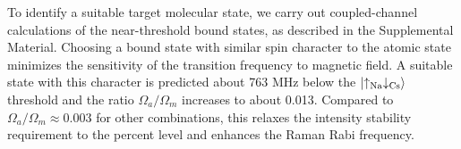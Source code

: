 \documentclass[aps,prl,twocolumn,10pt,superscriptaddress]{revtex4-1}
\newcommand{\Na}{\mathrm{Na}}
\newcommand{\Cs}{\mathrm{Cs}}
\begin{document}
To identify a suitable target molecular state, we carry out coupled-channel calculations of the near-threshold bound states, as described in the Supplemental Material.
Choosing a bound state with similar spin character to the atomic state  minimizes the sensitivity of the transition frequency to magnetic field.
A suitable state with this character is predicted about 763 MHz below the $\ket{\uparrow_{\Na} \downarrow_{\Cs}}$ threshold and the ratio $\Omega_a/\Omega_m$ increases to about 0.013.
Compared to $\Omega_a/\Omega_m \approx 0.003$
for other combinations, this relaxes the intensity stability requirement to the percent level and enhances the Raman Rabi frequency. %

\end{document}
